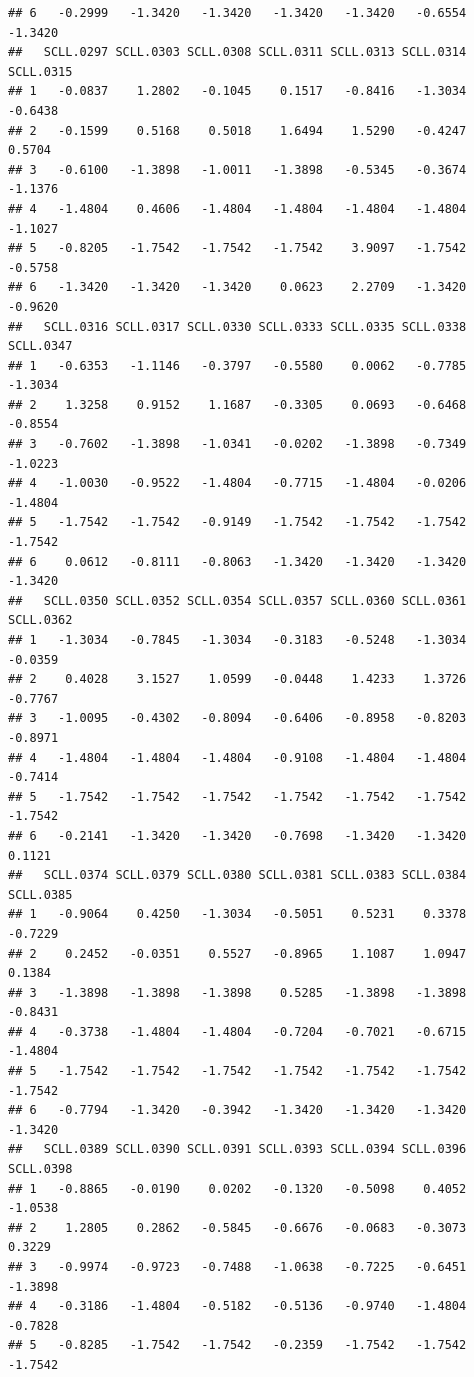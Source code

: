 \documentclass[
]{article}
\begin{document}
\begin{verbatim}
## 6   -0.2999   -1.3420   -1.3420   -1.3420   -1.3420   -0.6554   -1.3420
##   SCLL.0297 SCLL.0303 SCLL.0308 SCLL.0311 SCLL.0313 SCLL.0314 SCLL.0315
## 1   -0.0837    1.2802   -0.1045    0.1517   -0.8416   -1.3034   -0.6438
## 2   -0.1599    0.5168    0.5018    1.6494    1.5290   -0.4247    0.5704
## 3   -0.6100   -1.3898   -1.0011   -1.3898   -0.5345   -0.3674   -1.1376
## 4   -1.4804    0.4606   -1.4804   -1.4804   -1.4804   -1.4804   -1.1027
## 5   -0.8205   -1.7542   -1.7542   -1.7542    3.9097   -1.7542   -0.5758
## 6   -1.3420   -1.3420   -1.3420    0.0623    2.2709   -1.3420   -0.9620
##   SCLL.0316 SCLL.0317 SCLL.0330 SCLL.0333 SCLL.0335 SCLL.0338 SCLL.0347
## 1   -0.6353   -1.1146   -0.3797   -0.5580    0.0062   -0.7785   -1.3034
## 2    1.3258    0.9152    1.1687   -0.3305    0.0693   -0.6468   -0.8554
## 3   -0.7602   -1.3898   -1.0341   -0.0202   -1.3898   -0.7349   -1.0223
## 4   -1.0030   -0.9522   -1.4804   -0.7715   -1.4804   -0.0206   -1.4804
## 5   -1.7542   -1.7542   -0.9149   -1.7542   -1.7542   -1.7542   -1.7542
## 6    0.0612   -0.8111   -0.8063   -1.3420   -1.3420   -1.3420   -1.3420
##   SCLL.0350 SCLL.0352 SCLL.0354 SCLL.0357 SCLL.0360 SCLL.0361 SCLL.0362
## 1   -1.3034   -0.7845   -1.3034   -0.3183   -0.5248   -1.3034   -0.0359
## 2    0.4028    3.1527    1.0599   -0.0448    1.4233    1.3726   -0.7767
## 3   -1.0095   -0.4302   -0.8094   -0.6406   -0.8958   -0.8203   -0.8971
## 4   -1.4804   -1.4804   -1.4804   -0.9108   -1.4804   -1.4804   -0.7414
## 5   -1.7542   -1.7542   -1.7542   -1.7542   -1.7542   -1.7542   -1.7542
## 6   -0.2141   -1.3420   -1.3420   -0.7698   -1.3420   -1.3420    0.1121
##   SCLL.0374 SCLL.0379 SCLL.0380 SCLL.0381 SCLL.0383 SCLL.0384 SCLL.0385
## 1   -0.9064    0.4250   -1.3034   -0.5051    0.5231    0.3378   -0.7229
## 2    0.2452   -0.0351    0.5527   -0.8965    1.1087    1.0947    0.1384
## 3   -1.3898   -1.3898   -1.3898    0.5285   -1.3898   -1.3898   -0.8431
## 4   -0.3738   -1.4804   -1.4804   -0.7204   -0.7021   -0.6715   -1.4804
## 5   -1.7542   -1.7542   -1.7542   -1.7542   -1.7542   -1.7542   -1.7542
## 6   -0.7794   -1.3420   -0.3942   -1.3420   -1.3420   -1.3420   -1.3420
##   SCLL.0389 SCLL.0390 SCLL.0391 SCLL.0393 SCLL.0394 SCLL.0396 SCLL.0398
## 1   -0.8865   -0.0190    0.0202   -0.1320   -0.5098    0.4052   -1.0538
## 2    1.2805    0.2862   -0.5845   -0.6676   -0.0683   -0.3073    0.3229
## 3   -0.9974   -0.9723   -0.7488   -1.0638   -0.7225   -0.6451   -1.3898
## 4   -0.3186   -1.4804   -0.5182   -0.5136   -0.9740   -1.4804   -0.7828
## 5   -0.8285   -1.7542   -1.7542   -0.2359   -1.7542   -1.7542   -1.7542

\end{verbatim}
\end{document}

